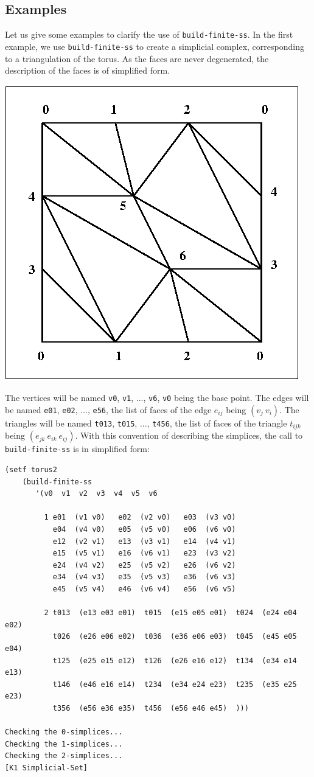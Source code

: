 \subsection* {Examples}
Let us give some examples to clarify the use of {\tt build-finite-ss}. In the first example,
we use  {\tt build-finite-ss} to create a simplicial complex, cor\-res\-pon\-ding to a
triangulation of the torus. As the faces are never degenerated, the description of the faces
is of simplified form.
%
\vskip 0.40cm
\centerline{\includegraphics{torus2.eps}}
\vskip 0.40cm
%
The vertices will be named {\tt v0}, {\tt v1}, ..., {\tt v6}, {\tt v0} being the base point. The edges
will be named {\tt e01}, {\tt e02}, ...,  {\tt e56}, the list of faces of the edge $e_{ij}$ being
$(v_j\  v_i)$. The triangles will be named {\tt t013}, {\tt t015}, ..., {\tt t456}, the list of faces of
the triangle $t_{ijk}$ being $(e_{jk}\  e_{ik}\  e_{ij})$.
With this convention of describing the simplices, the call to {\tt build-finite-ss} is in simplified form:
{\footnotesize\begin{verbatim}
(setf torus2
    (build-finite-ss 
       '(v0  v1  v2  v3  v4  v5  v6 

         1 e01  (v1 v0)   e02  (v2 v0)   e03  (v3 v0)
           e04  (v4 v0)   e05  (v5 v0)   e06  (v6 v0)
           e12  (v2 v1)   e13  (v3 v1)   e14  (v4 v1)
           e15  (v5 v1)   e16  (v6 v1)   e23  (v3 v2)
           e24  (v4 v2)   e25  (v5 v2)   e26  (v6 v2)
           e34  (v4 v3)   e35  (v5 v3)   e36  (v6 v3)
           e45  (v5 v4)   e46  (v6 v4)   e56  (v6 v5)

         2 t013  (e13 e03 e01)  t015  (e15 e05 e01)  t024  (e24 e04 e02)
           t026  (e26 e06 e02)  t036  (e36 e06 e03)  t045  (e45 e05 e04)
           t125  (e25 e15 e12)  t126  (e26 e16 e12)  t134  (e34 e14 e13)
           t146  (e46 e16 e14)  t234  (e34 e24 e23)  t235  (e35 e25 e23)
           t356  (e56 e36 e35)  t456  (e56 e46 e45)  )))

Checking the 0-simplices...
Checking the 1-simplices...
Checking the 2-simplices...
[K1 Simplicial-Set]
\end{verbatim}}
